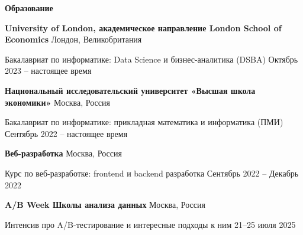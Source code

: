 \begin{center}
    \textbf{Образование}
\end{center}

\textbf{University of London, академическое направление London School of Economics} \hfill Лондон, Великобритания

Бакалавриат по информатике: Data Science и бизнес-аналитика (DSBA) \hfill Октябрь 2023 – настоящее время

\textbf{Национальный исследовательский университет «Высшая школа экономики»} \hfill Москва, Россия

Бакалавриат по информатике: прикладная математика и информатика (ПМИ) \hfill Сентябрь 2022 – настоящее время

\textbf{Веб-разработка} \hfill Москва, Россия

Курс по веб-разработке: frontend и backend разработка \hfill Сентябрь 2022 – Декабрь 2022

\textbf{A/B Week Школы анализа данных} \hfill Москва, Россия

Интенсив про A/B-тестирование и интересные подходы к ним \hfill 21–25 июля 2025
